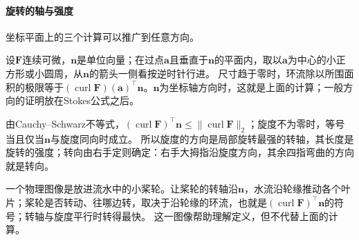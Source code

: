 \paragraph{旋转的轴与强度}

坐标平面上的三个计算可以推广到任意方向。

设$\bm F$连续可微，$\bm n$是单位向量；在过点$\bm a$且垂直于$\bm n$的平面内，取以$\bm a$为中心的小正方形或小圆周，从$\bm n$的箭头一侧看按逆时针行进。
尺寸趋于零时，环流除以所围面积的极限等于$(\operatorname{curl}\bm F)(\bm a)^\top\bm n$。$\bm n$为坐标轴方向时，这就是上面的计算；一般方向的证明放在Stokes公式之后。

由Cauchy--Schwarz不等式，$(\operatorname{curl}\bm F)^\top\bm n\leq\lVert\operatorname{curl}\bm F\rVert_2$；旋度不为零时，等号当且仅当$\bm n$与旋度同向时成立。
所以旋度的方向是局部旋转最强的转轴，其长度是旋转的强度；转向由右手定则确定：右手大拇指沿旋度方向，其余四指弯曲的方向就是转向。

一个物理图像是放进流水中的小桨轮。让桨轮的转轴沿$\bm n$，水流沿轮缘推动各个叶片；桨轮是否转动、往哪边转，取决于沿轮缘的环流，也就是$(\operatorname{curl}\bm F)^\top\bm n$的符号；转轴与旋度平行时转得最快。
这一图像帮助理解定义，但不代替上面的计算。

